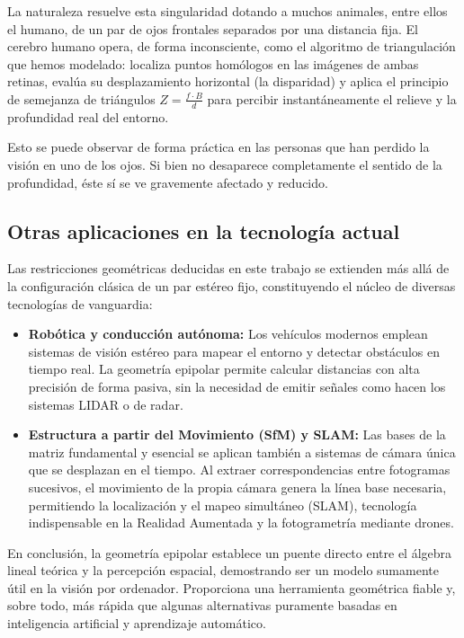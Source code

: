 \documentclass[
10pt, %
a4paper, %
oneside, %
headinclude,footinclude, %
BCOR=5mm, %
]{scrartcl}
\begin{document}
La naturaleza resuelve esta singularidad dotando a muchos animales, entre ellos el humano, de un par de ojos frontales separados por una distancia fija. El cerebro humano opera, de forma inconsciente, como el algoritmo de triangulación que hemos modelado: localiza puntos homólogos en las imágenes de ambas retinas, evalúa su desplazamiento horizontal (la disparidad) y aplica el principio de semejanza de triángulos $Z = \frac{f \cdot B}{d}$ para percibir instantáneamente el relieve y la profundidad real del entorno.

Esto se puede observar de forma práctica en las personas que han perdido la visión en uno de los ojos. Si bien no desaparece completamente el sentido de la profundidad, éste sí se ve gravemente afectado y reducido.

\subsection{Otras aplicaciones en la tecnología actual}

Las restricciones geométricas deducidas en este trabajo se extienden más allá de la configuración clásica de un par estéreo fijo, constituyendo el núcleo de diversas tecnologías de vanguardia:

\begin{itemize}
    \item \textbf{Robótica y conducción autónoma:} Los vehículos modernos emplean sistemas de visión estéreo para mapear el entorno y detectar obstáculos en tiempo real. La geometría epipolar permite calcular distancias con alta precisión de forma pasiva, sin la necesidad de emitir señales como hacen los sistemas LIDAR o de radar.
    \item \textbf{Estructura a partir del Movimiento (SfM) y SLAM:} Las bases de la matriz fundamental y esencial se aplican también a sistemas de cámara única que se desplazan en el tiempo. Al extraer correspondencias entre fotogramas sucesivos, el movimiento de la propia cámara genera la línea base necesaria, permitiendo la localización y el mapeo simultáneo (SLAM), tecnología indispensable en la Realidad Aumentada y la fotogrametría mediante drones.
\end{itemize}

En conclusión, la geometría epipolar establece un puente directo entre el álgebra lineal teórica y la percepción espacial, demostrando ser un modelo sumamente útil en la visión por ordenador. Proporciona una herramienta geométrica fiable y, sobre todo, más rápida que algunas alternativas puramente basadas en inteligencia artificial y aprendizaje automático.
\end{document}
